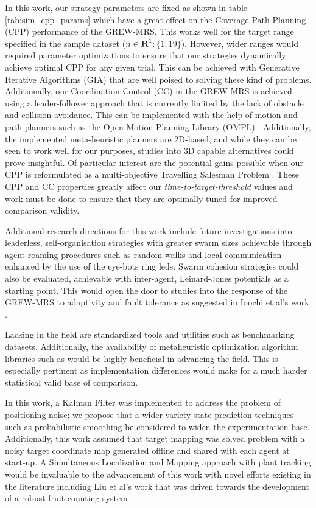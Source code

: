 \documentclass{report}
\begin{document}
In this work, our strategy parameters are fixed as shown in table \ref{tab:sim_cpp_params} which have a great effect on the Coverage Path Planning (CPP) performance of the GREW-MRS. This works well for the target range specified in the sample dataset ($n \in \boldsymbol{R^1}: \{1,19\}$). However, wider ranges would required parameter optimizations to ensure that our strategies dynamically achieve optimal CPP for any given trial. This can be achieved with Generative Iterative Algorithms (GIA) that are well poised to solving these kind of problems. Additionally, our Coordination Control (CC) in the GREW-MRS is achieved using a leader-follower approach that is currently limited by the lack of obstacle and collision avoidance. This can be implemented with the help of motion and path planners such as the Open Motion Planning Library (OMPL) \cite{Sucan2012}. Additionally, the implemented meta-heuristic planners are 2D-based, and while they can be seen to work well for our purposes, studies into 3D capable alternatives could prove insightful. Of particular interest are the potential gains possible when our CPP is reformulated as a multi-objective Travelling Salesman Problem \cite{Lust2010}. These CPP and CC properties greatly affect our \textit{time-to-target-threshold} values and work must be done to ensure that they are optimally tuned for improved comparison validity.

Additional research directions for this work include future investigations into leaderless, self-organisation strategies with greater swarm sizes achievable through agent roaming procedures such as random walks and local communication enhanced by the use of the eye-bots ring leds. Swarm cohesion strategies could also be evaluated, achievable with inter-agent, Leinard-Jones potentials as a starting point. This would open the door to studies into the response of the GREW-MRS to adaptivity and fault tolerance as suggested in Ioochi et al's work \cite{Iocchi2001}.

Lacking in the field are standardized tools and utilities such as benchmarking datasets. Additionally, the availability of metaheuristic optimization algorithm libraries such as \cite{James2018} would be highly beneficial in advancing the field. This is especially pertinent as implementation differences would make for a much harder statistical valid base of comparison.

In this work, a Kalman Filter was implemented to address the problem of positioning noise; we propose that a wider variety state prediction techniques such as probabilistic smoothing be considered to widen the experimentation base. Additionally, this work assumed that target mapping was solved problem with a noisy target coordinate map generated offline and shared with each agent at start-up. A Simultaneous Localization and Mapping approach with plant tracking would be invaluable to the advancement of this work with novel efforts existing in the literature including Liu et al's work that was driven towards the development of a robust fruit counting system \cite{Liu2018}.
\end{document}
